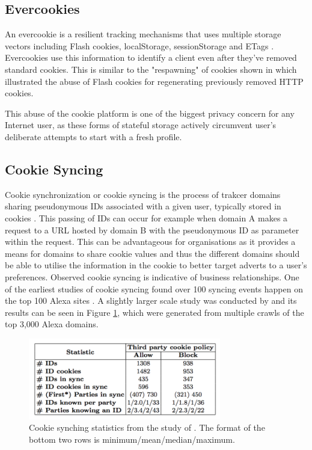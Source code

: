 \documentclass{article}
\begin{document}
\subsection{Evercookies}
An evercookie is a resilient tracking mechanisms that uses multiple storage vectors including Flash cookies, localStorage, sessionStorage and ETags \parencite{evercookies}. Evercookies use this information to identify a client even after they've removed standard cookies. This is similar to the "respawning" of cookies shown in \parencite{flashCookiesPrivacy} which illustrated the abuse of Flash cookies for regenerating previously removed HTTP cookies. \newline

This abuse of the cookie platform is one of the biggest privacy concern for any Internet user, as these forms of stateful storage actively circumvent user's deliberate attempts to start with a fresh profile. 

\subsection{Cookie Syncing}
Cookie synchronization or cookie syncing is the process of trakcer domains sharing pseudonymous IDs associated with a given user, typically stored in cookies \parencite{webNeverForgets}. This passing of IDs can occur for example when domain A makes a request to a URL hosted by domain B with the pseudonymous ID as parameter within the request. This can be advantageous for organisations as it provides a means for domains to share cookie values and thus the different domains should be able to utilise the information in the cookie to better target adverts to a user's preferences. Observed cookie syncing is indicative of business relationships.  One of the earliest studies of cookie syncing found over 100 syncing events happen on the top 100 Alexa sites \parencite{sellingPrivacy}. A slightly larger scale study was conducted by \parencite{webNeverForgets} and its results can be seen in Figure \ref{fig:cookieSynching}, which were generated from multiple crawls of the top 3,000 Alexa domains. 

\begin{figure}[H]
    \centering
    \includegraphics[width=0.75\textwidth]{cookieSynching}
    \caption{Cookie synching statistics from the study of \parencite{webNeverForgets}. The format of the bottom two rows is minimum/mean/median/maximum.}
    \label{fig:cookieSynching}
\end{figure}
\end{document}
